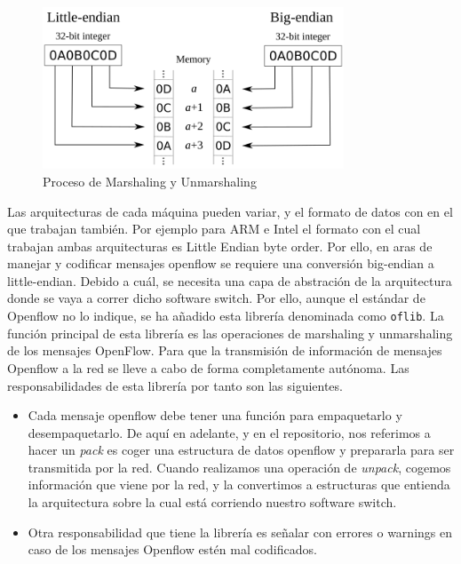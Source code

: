 \begin{figure}[ht]
    \centering
    \includegraphics[width=0.8\textwidth]{archivos/img/teoria/bofuss6.png}
    \caption{Proceso de Marshaling y Unmarshaling }
    \label{fig:bofuss6}
\end{figure}

Las arquitecturas de cada máquina pueden variar, y el formato de datos con en el que trabajan también. Por ejemplo para ARM e Intel el formato con el cual trabajan ambas arquitecturas es Little Endian byte order. Por ello, en aras de manejar y codificar mensajes openflow se requiere una conversión big-endian a little-endian. Debido a cuál, se necesita una capa de abstración de la arquitectura donde se vaya a correr dicho software switch. Por ello, aunque el estándar de Openflow no lo indique, se ha añadido esta librería denominada como \texttt{oflib}. La función principal de esta librería es las operaciones de  marshaling y unmarshaling de los mensajes OpenFlow. Para que la transmisión de información de mensajes Openflow a la red se lleve a cabo de forma completamente autónoma. Las responsabilidades de esta librería por tanto son las siguientes.

\begin{itemize}
    \item Cada mensaje openflow debe tener una función para empaquetarlo y desempaquetarlo. De aquí en adelante, y en el repositorio, nos referimos a hacer un \textit{pack} es coger una estructura de datos openflow y prepararla para ser transmitida por la red. Cuando realizamos una operación de \textit{unpack}, cogemos información que viene por la red, y la convertimos a estructuras que entienda la arquitectura sobre la cual está corriendo nuestro software switch.
    \item Otra responsabilidad que tiene la librería es señalar con errores o warnings en caso de los mensajes Openflow estén mal codificados.
\end{itemize}


